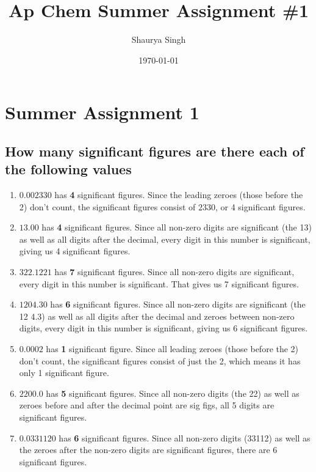 \documentclass{scrartcl}
\author{Shaurya Singh}
\date{\today}
\title{Ap Chem Summer Assignment \#1}
\begin{document}
\maketitle
\setcounter{tocdepth}{1}
\tableofcontents


\section{Summer Assignment 1}
\label{sec:org997b19f}
\subsection{How many significant figures are there each of the following values}
\label{sec:orgb81734e}
\begin{enumerate}
\item \(0.002330\) has \textbf{4} significant figures. Since the leading zeroes (those before the 2) don't count, the significant figures consist of \(2330\), or 4 significant figures.
\item \(13.00\) has \textbf{4} significant figures. Since all non-zero digits are significant (the 13) as well as all digits after the decimal, every digit in this number is significant, giving us 4 significant figures.
\item \(322.1221\) has \textbf{7} significant figures. Since all non-zero digits are significant, every digit in this number is significant. That gives us 7 significant figures.
\item \(1204.30\) has \textbf{6} significant figures. Since all non-zero digits are significant (the 12 4.3) as well as all digits after the decimal and zeroes between non-zero digits, every digit in this number is significant, giving us 6 significant figures.
\item \(0.0002\) has \textbf{1} significant figure. Since all leading zeroes (those before the 2) don't count, the significant figures consist of just the 2, which means it has only 1 significant figure.
\item \(2200.0\) has \textbf{5} significant figures. Since all non-zero digits (the 22) as well as zeroes before and after the decimal point are sig figs, all 5 digits are significant figures.
\item \(0.0331120\) has \textbf{6} significant figures. Since all non-zero digits (33112) as well as the zeroes after the non-zero digits are significant figures, there are 6 significant figures.
\end{enumerate}
\end{document}
